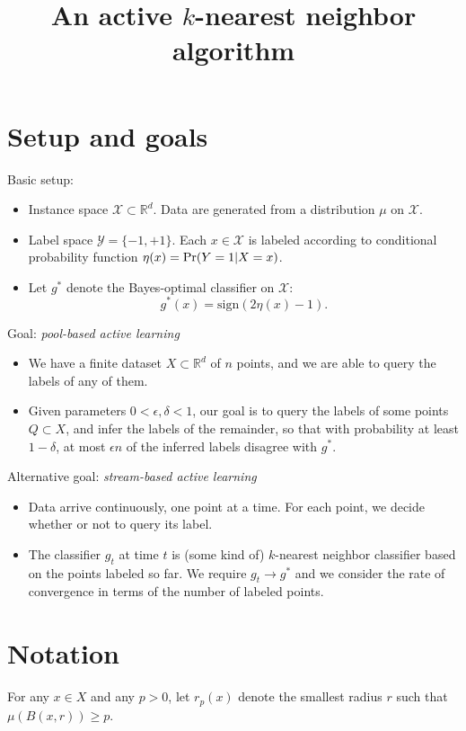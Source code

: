 \documentclass{article}
\title{An active $k$-nearest neighbor algorithm}
\def\R{{\mathbb{R}}}
\def\pr{{\rm Pr}}
\def\X{{\mathcal X}}
\def\Y{{\mathcal Y}}
\begin{document}
\maketitle

\section{Setup and goals}

Basic setup:
\begin{itemize}
\item Instance space $\X \subset \R^d$. Data are generated from a distribution $\mu$ on $\X$.
\item Label space $\Y = \{-1,+1\}$. Each $x \in \X$ is labeled according to conditional probability function $\eta(x) = \pr(Y=1|X=x)$.
\item Let $g^*$ denote the Bayes-optimal classifier on $\X$:
$$ g^*(x) = \mbox{sign}(2 \eta(x) - 1) .$$
\end{itemize}

\noindent
Goal: \emph{pool-based active learning}
\begin{itemize}
\item We have a finite dataset $X \subset \R^d$ of $n$ points, and we are able to query the labels of any of them.
\item Given parameters $0 < \epsilon, \delta < 1$, our goal is to query the labels of some points $Q \subset X$, and infer the labels of the remainder, so that with probability at least $1-\delta$, at most $\epsilon n$ of the inferred labels disagree with $g^*$.
\end{itemize}

\noindent
Alternative goal: \emph{stream-based active learning}
\begin{itemize}
\item Data arrive continuously, one point at a time. For each point, we decide whether or not to query its label.
\item The classifier $g_t$ at time $t$ is (some kind of) $k$-nearest neighbor classifier based on the points labeled so far. We require $g_t \rightarrow g^*$ and we consider the rate of convergence in terms of the number of labeled points.
\end{itemize}

\section{Notation}

For any $x \in X$ and any $p > 0$, let $r_p(x)$ denote the smallest radius $r$ such that $\mu(B(x, r)) \geq p$. 
\end{document}
